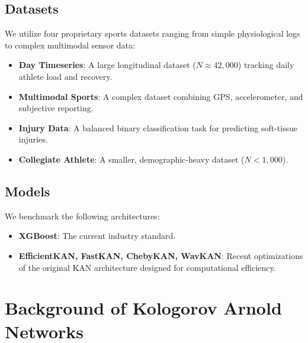 \documentclass{article} %
\begin{document}
\subsection{Datasets}
We utilize four proprietary sports datasets ranging from simple physiological logs to complex multimodal sensor data:
\begin{itemize}
    \item \textbf{Day Timeseries}: A large longitudinal dataset ($N \approx 42,000$) tracking daily athlete load and recovery.
    \item \textbf{Multimodal Sports}: A complex dataset combining GPS, accelerometer, and subjective reporting.
    \item \textbf{Injury Data}: A balanced binary classification task for predicting soft-tissue injuries.
    \item \textbf{Collegiate Athlete}: A smaller, demographic-heavy dataset ($N < 1,000$).
\end{itemize}

\subsection{Models}
We benchmark the following architectures:
\begin{itemize}
    \item \textbf{XGBoost}: The current industry standard.
    \item \textbf{EfficientKAN, FastKAN, ChebyKAN, WavKAN}: Recent optimizations of the original KAN architecture designed for computational efficiency.
\end{itemize}

\section{Background of Kologorov Arnold Networks}
\end{document}
